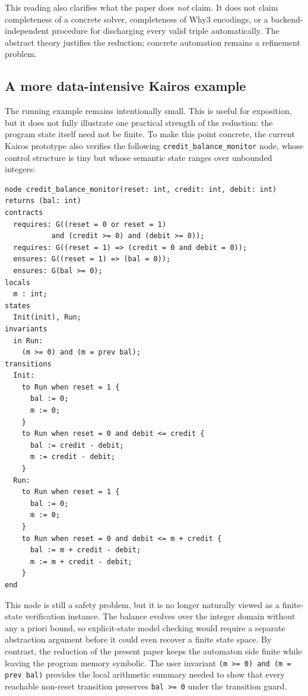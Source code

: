 \documentclass[acmsmall,screen]{acmart}
\theoremstyle{leftplain}
\theoremstyle{leftdefinition}
\theoremstyle{leftremark}
\begin{document}
This reading also clarifies what the paper does \emph{not} claim. It does not
claim completeness of a concrete solver, completeness of Why3 encodings, or a
backend-independent procedure for discharging every valid triple automatically.
The abstract theory justifies the reduction; concrete automation remains a
refinement problem.

\subsection{A more data-intensive Kairos example}
The running example remains intentionally small. This is useful for exposition,
but it does not fully illustrate one practical strength of the reduction:
the program state itself need not be finite. To make this point concrete, the
current Kairos prototype also verifies the following \texttt{credit\_balance\_monitor}
node, whose control structure is tiny but whose semantic state ranges over
unbounded integers:

\begin{lstlisting}[style=kairosstyle]
node credit_balance_monitor(reset: int, credit: int, debit: int)
returns (bal: int)
contracts
  requires: G((reset = 0 or reset = 1)
           and (credit >= 0) and (debit >= 0));
  requires: G((reset = 1) => (credit = 0 and debit = 0));
  ensures: G((reset = 1) => (bal = 0));
  ensures: G(bal >= 0);
locals
  m : int;
states
  Init(init), Run;
invariants
  in Run:
    (m >= 0) and (m = prev bal);
transitions
  Init:
    to Run when reset = 1 {
      bal := 0;
      m := 0;
    }
    to Run when reset = 0 and debit <= credit {
      bal := credit - debit;
      m := credit - debit;
    }
  Run:
    to Run when reset = 1 {
      bal := 0;
      m := 0;
    }
    to Run when reset = 0 and debit <= m + credit {
      bal := m + credit - debit;
      m := m + credit - debit;
    }
end
\end{lstlisting}

This node is still a safety problem, but it is no longer naturally viewed as a
finite-state verification instance. The balance evolves over the integer domain
without any a priori bound, so explicit-state model checking would require a
separate abstraction argument before it could even recover a finite state
space. By contrast, the reduction of the present paper keeps the automaton side
finite while leaving the program memory symbolic. The user invariant
\lstinline|(m >= 0) and (m = prev bal)| provides the local arithmetic summary
needed to show that every reachable non-reset transition preserves
\lstinline|bal >= 0| under the transition guard.
\end{document}
